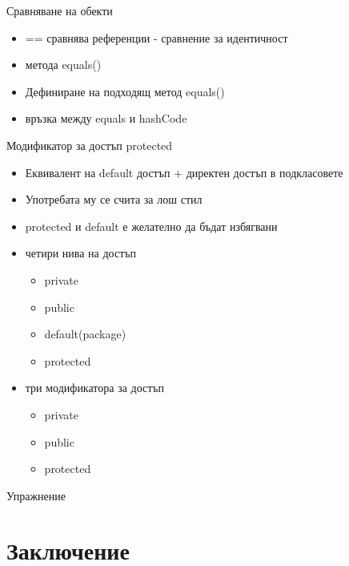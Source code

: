 \documentclass{beamer}
\begin{document}
\begin{frame}{Сравняване на обекти}
  \transdissolve
  \begin{itemize}
  \item == сравнява референции - сравнение за идентичност
  \item метода equals()
  \item Дефиниране на подходящ метод equals()
  \item връзка между equals и hashCode
  \end{itemize}
\end{frame}

\begin{frame}{Модификатор за достъп protected}
  \transdissolve
  \begin{itemize}
  \item Еквивалент на default достъп + директен достъп в подкласовете
  \item Употребата му се счита за лош стил
  \item protected и default е желателно да бъдат избягвани
  \item четири нива на достъп
    \begin{itemize}
      \item private
      \item public
      \item default(package)
      \item protected
    \end{itemize}
  \item три модификатора за достъп
    \begin{itemize}
      \item private
      \item public
      \item protected
    \end{itemize}

  \end{itemize}
\end{frame}


\begin{frame}{Упражнение}
  \transdissolve
  
\end{frame}


\section*{Заключение}
\end{document}

